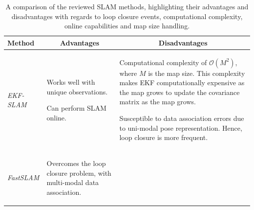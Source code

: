\begin{table}[H]
\centering
\caption[SLAM method comparison]{A comparison of the reviewed SLAM methods, highlighting their advantages and disadvantages with regards to loop closure events, computational complexity, online capabilities and map size handling.}
    \begin{tabular}{p{6.5em}p{5.5cm} p{5.5cm}} 
\toprule[1.5pt] 
\multicolumn{1}{l}{\textbf{Method}}     & \multicolumn{1}{c}{\textbf{Advantages}}  & \multicolumn{1}{c}{\textbf{Disadvantages}} \\ 
\midrule[0.5pt]
  {\em EKF-SLAM }      & 
        \begin{compactitem}{\small
        \item Works well with unique observations.
        \item Can perform SLAM online.}
    \end{compactitem}   & 
    \begin{compactitem}{\small
        \item Computational complexity of $\mathcal{O}(M^2)$, where $M$ is the map size. This complexity makes EKF computationally expensive as the map grows to update the covariance matrix as the map grows.
        \item Susceptible to data association errors due to uni-modal pose representation. Hence, loop closure is more frequent.}
    \end{compactitem}\\
\hline
   {\em  FastSLAM  }     &
    \begin{compactitem}{\small
        \item Overcomes the loop closure problem, with multi-modal data association.
}
\end{compactitem}
\end{tabular}
\end{table}

